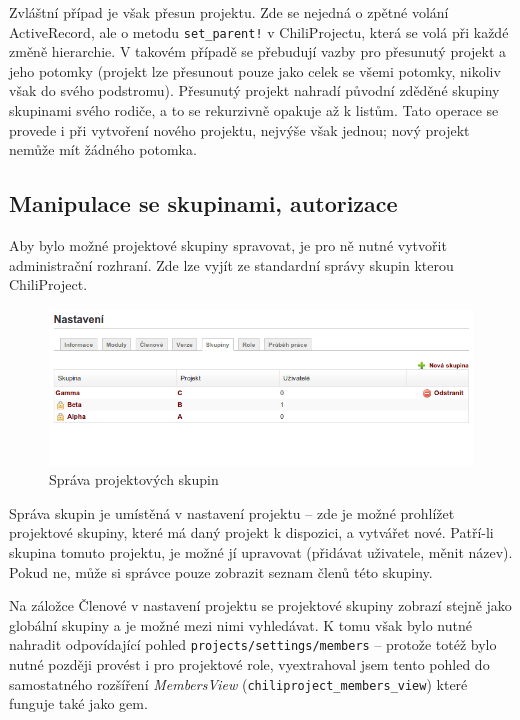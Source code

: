 \documentclass[thesis=B,czech]{FITthesis}[2012/05/02]
\begin{document}
Zvláštní případ je však přesun projektu. Zde se nejedná o zpětné volání
ActiveRecord, ale o metodu \lstinline"set_parent!" v ChiliProjectu,
která se volá při každé změně hierarchie. V takovém případě se přebudují
vazby pro přesunutý projekt a jeho potomky (projekt lze přesunout pouze
jako celek se všemi potomky, nikoliv však do svého podstromu). Přesunutý
projekt nahradí původní zděděné skupiny skupinami svého rodiče, a to se
rekurzivně opakuje až k listům.
Tato operace se provede i při vytvoření nového projektu, nejvýše však
jednou; nový projekt nemůže mít žádného potomka.

\subsection{Manipulace se skupinami, autorizace}

Aby bylo možné projektové skupiny spravovat, je pro ně nutné vytvořit
administrační rozhraní. Zde lze vyjít ze standardní správy skupin kterou
ChiliProject.

\begin{figure}[tbp]
\centering
\includegraphics[width=1\textwidth]{group-gui1.png}
\caption{Správa projektových skupin}
\end{figure}

Správa skupin je umístěná v nastavení projektu -- zde je možné prohlížet
projektové skupiny, které má daný projekt k dispozici, a vytvářet nové.
Patří-li skupina tomuto projektu, je možné jí upravovat (přidávat
uživatele, měnit název). Pokud ne, může si správce pouze zobrazit seznam
členů této skupiny.

Na záložce Členové v nastavení projektu se projektové skupiny zobrazí
stejně jako globální skupiny a je možné mezi nimi vyhledávat. K tomu
však bylo nutné nahradit odpovídající pohled
\lstinline!projects/settings/members! -- protože totéž bylo nutné
později provést i pro projektové role, vyextrahoval jsem tento pohled do
samostatného rozšíření \emph{MembersView}
(\lstinline!chiliproject_members_view!) které funguje také jako
\gls{gem}.
\end{document}
